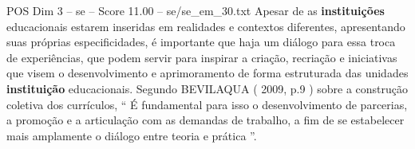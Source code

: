 \begin{textsample}{POS Dim 3 – se – Score 11.00 – se/se\_em\_30.txt}
Apesar de as \textbf{instituições} educacionais estarem inseridas em realidades e contextos diferentes, apresentando suas próprias especificidades, é importante que haja um diálogo para essa troca de experiências, que podem servir para inspirar a criação, recriação e iniciativas que visem o desenvolvimento e aprimoramento de forma estruturada das unidades \textbf{instituição} educacionais.
Segundo BEVILAQUA ( 2009, p.9 ) sobre a construção coletiva dos currículos, “ É fundamental para isso o desenvolvimento de parcerias, a promoção e a articulação com as demandas de trabalho, a fim de se estabelecer mais amplamente o diálogo entre teoria e prática ”.

\end{textsample}
